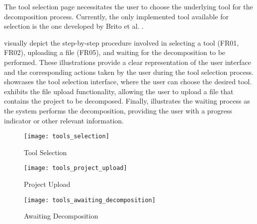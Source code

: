 The tool selection page necessitates the user to choose the underlying tool for
the decomposition process. Currently, the only implemented tool available for
selection is the one developed by Brito et al.
.

visually depict the step-by-step procedure involved in selecting a tool (FR01,
FR02), uploading a file (FR05), and waiting for the decomposition to be
performed. These illustrations provide a clear representation of the user
interface and the corresponding actions taken by the user during the tool
selection process.  showcases the tool selection
interface, where the user can choose the desired tool.
 exhibits the file upload functionality, allowing the
user to upload a file that contains the project to be decomposed. Finally,
 illustrates the waiting process as the system
performs the decomposition, providing the user with a progress indicator or
other relevant information.

\begin{figure*}[!htb]
  \centering
  \texttt{[image: tools\_selection]}
  \caption{Tool Selection}
  \label{fig:tool_selection}
\end{figure*}
\begin{figure*}[!htb]
  \centering
  \texttt{[image: tools\_project\_upload]}
  \caption{Project Upload}
  \label{fig:project_upload}
\end{figure*}
\begin{figure*}[!htb]
  \centering
  \texttt{[image: tools\_awaiting\_decomposition]}
  \caption{Awaiting Decomposition}
  \label{fig:awaiting_decomposition}
\end{figure*}
